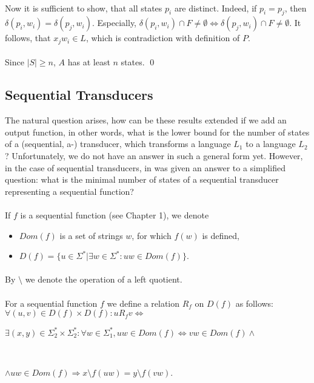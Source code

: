 \paragraph{}
Now it is sufficient to show, that all states $p_{i}$ are distinct. Indeed, if $p_{i} = p_{j}$, then $\delta (p_{i}, w_{i}) = \delta (p_{j}, w_{i})$. Especially, $\delta (p_{i}, w_{i}) \cap F \neq \emptyset \Leftrightarrow \delta (p_{j}, w_{i}) \cap F\neq \emptyset $. It follows, that $x_{j}w_{i} \in L$, which is contradiction with definition of $P$.

\paragraph{}
Since $|S| \geq n$, $A$ has at least $n$ states. \qed

\subsection{Sequential Transducers}
The natural question arises, how can be these results extended if we add an output function, in other words, what is the lower bound for the number of states of a (sequential, a-) transducer, which transforms a language $L_{1}$ to a language $L_{2}$? Unfortunately, we do not have an answer in such a general form yet. However, in the case of sequential transducers, in \cite{moh:min} was given an answer to a simplified question: what is the minimal number of states of a sequential transducer representing a sequential function?

\paragraph{}
\oznacenie If $f$ is a sequential function (see Chapter 1), we denote
\begin{itemize}
\item $Dom(f)$ is a set of strings $w$, for which $f(w)$ is defined,
\item $D(f) = \{ u \in \Sigma ^{*} | \exists w \in \Sigma ^{*}: uw \in Dom(f) \} $.
\end{itemize}

\paragraph{}
\oznacenie By $\setminus $ we denote the operation of a left quotient.

\paragraph{}
 For a sequential function $f$  we define a relation $R_{f}$ on $D(f)$ as follows:\\
$\forall (u, v) \in D(f) \times D(f): u R_{f} v \iff$ \\
\centerline{$\exists (x, y) \in \Sigma_{2}^* \times \Sigma_{2}^*: \forall w \in \Sigma_{1}^{*}, uw \in Dom(f) \Leftrightarrow vw \in Dom(f) \wedge $}\\
\centerline{$\wedge uw \in Dom(f) \Rightarrow x\setminus f(uw) = y\setminus f(vw)$.}


